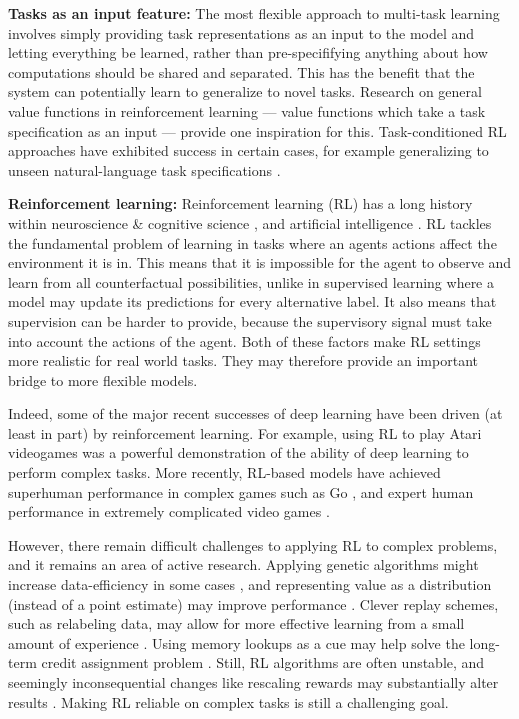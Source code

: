 \textbf{Tasks as an input feature:} The most flexible approach to multi-task learning involves simply providing task representations as an input to the model and letting everything be learned, rather than pre-specififying anything about how computations should be shared and separated. This has the benefit that the system can potentially learn to generalize to novel tasks. Research on general value functions in reinforcement learning \citep{Sutton2011} --- value functions which take a task specification as an input --- provide one inspiration for this. Task-conditioned RL approaches have exhibited success in certain cases, for example generalizing to unseen natural-language task specifications \citep{Hermann2017}.  \par

\textbf{Reinforcement learning:} Reinforcement learning (RL) has a long history within neuroscience \& cognitive science \citep{Odoherty2003,Niv2009,Dabney2020}, and artificial intelligence \citep{Sutton2017}. RL tackles the fundamental problem of learning in tasks where an agents actions affect the environment it is in. This means that it is impossible for the agent to observe and learn from all counterfactual possibilities, unlike in supervised learning where a model may update its predictions for every alternative label. It also means that supervision can be harder to provide, because the supervisory signal must take into account the actions of the agent. Both of these factors make RL settings more realistic for real world tasks. They may therefore provide an important bridge to more flexible models.\par 
Indeed, some of the major recent successes of deep learning have been driven (at least in part) by reinforcement learning. For example, using RL to play Atari videogames \citep{Mnih2015} was a powerful demonstration of the ability of deep learning to perform complex tasks. More recently, RL-based models have achieved superhuman performance in complex games such as Go \citep{Silver2016,Silver2017}, and expert human performance in extremely complicated video games \citep{OpenAI2019,Vinyals2019}. \par
However, there remain difficult challenges to applying RL to complex problems, and it remains an area of active research. Applying genetic algorithms might increase data-efficiency in some cases \citep{Petroski2018}, and representing value as a distribution (instead of a point estimate) may improve performance \citep{Bellemare2017}. Clever replay schemes, such as relabeling data, may allow for more effective learning from a small amount of experience \citep{Andrychowicz2017}. Using memory lookups as a cue may help solve the long-term credit assignment problem \citep{Hung2019}. Still, RL algorithms are often unstable, and seemingly inconsequential changes like rescaling rewards may substantially alter results \citep{Henderson2018}. Making RL reliable on complex tasks is still a challenging goal. \par  

